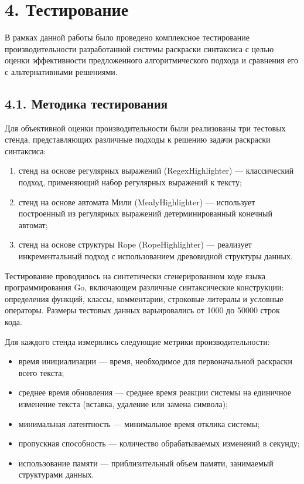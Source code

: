 \section*{4. Тестирование}

В рамках данной работы было проведено комплексное тестирование производительности разработанной системы раскраски синтаксиса с целью оценки эффективности предложенного алгоритмического подхода и сравнения его с альтернативными решениями.

\subsection*{4.1. Методика тестирования}

Для объективной оценки производительности были реализованы три тестовых стенда, представляющих различные подходы к решению задачи раскраски синтаксиса:

\begin{enumerate}
\item стенд на основе регулярных выражений (RegexHighlighter) — классический подход, применяющий набор регулярных выражений к тексту;
\item стенд на основе автомата Мили (MealyHighlighter) — использует построенный из регулярных выражений детерминированный конечный автомат;
\item стенд на основе структуры Rope (RopeHighlighter) — реализует инкрементальный подход с использованием древовидной структуры данных.
\end{enumerate}

Тестирование проводилось на синтетически сгенерированном коде языка программирования Go, включающем различные синтаксические конструкции: определения функций, классы, комментарии, строковые литералы и условные операторы. Размеры тестовых данных варьировались от 1000 до 50000 строк кода.

Для каждого стенда измерялись следующие метрики производительности:

\begin{itemize}
\item время инициализации — время, необходимое для первоначальной раскраски всего текста;
\item среднее время обновления — среднее время реакции системы на единичное изменение текста (вставка, удаление или замена символа);
\item минимальная латентность — минимальное время отклика системы;
\item пропускная способность — количество обрабатываемых изменений в секунду;
\item использование памяти — приблизительный объем памяти, занимаемый структурами данных.
\end{itemize}

